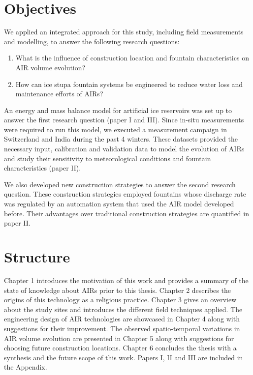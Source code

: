 \section{Objectives}

We applied an integrated approach for this study, including field measurements and modelling, to answer the
following research questions: 

\begin{enumerate}

\item What is the influence of construction location and fountain characteristics on AIR volume evolution? 

\item How can ice stupa fountain systems be engineered to reduce water loss and maintenance efforts of AIRs?

\end{enumerate}

An energy and mass balance model for artificial ice reservoirs was set up to answer the first research question
(paper I and III). Since in-situ measurements were required to run this model, we executed a measurement campaign
in Switzerland and India during the past 4 winters. These datasets provided the necessary input, calibration and
validation data to model the evolution of AIRs and study their sensitivity to meteorological conditions and
fountain characteristics (paper II). 

We also developed new construction strategies to answer the second research question. These construction
strategies employed fountains whose discharge rate was regulated by an automation system that used the AIR model
developed before. Their advantages over traditional construction strategies are quantified in paper II.

\section{Structure}

Chapter 1 introduces the motivation of this work and provides a summary of the state of knowledge about AIRs
prior to this thesis. Chapter 2 describes the origins of this technology as a religious practice. Chapter 3
gives an overview about the study sites and introduces the different field techniques applied. The engineering
design of AIR technologies are showcased in Chapter 4 along with suggestions for their improvement. The observed
spatio-temporal variations in AIR volume evolution are presented in Chapter 5 along with suggestions for
choosing future construction locations. Chapter 6 concludes the thesis with a synthesis and the future scope of
this work. Papers I, II and III are included in the Appendix.

